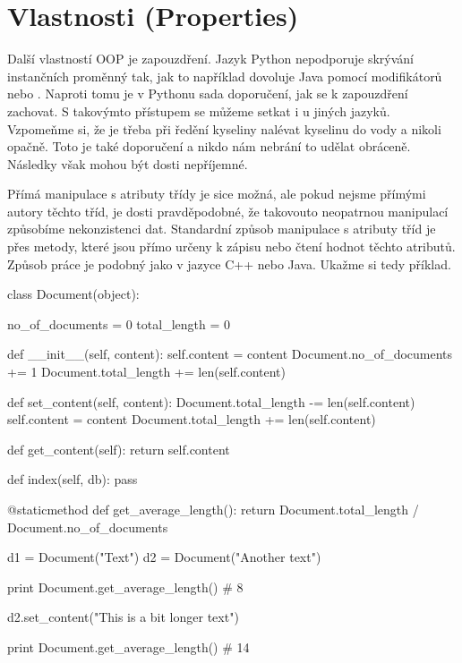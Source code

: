 \section{Vlastnosti (Properties)}

Další vlastností OOP je zapouzdření. Jazyk Python nepodporuje skrývání instančních
proměnný tak, jak to například dovoluje Java pomocí modifikátorů  nebo .
Naproti tomu je v Pythonu sada doporučení, jak se k zapouzdření zachovat. S takovýmto přístupem se můžeme
setkat i u jiných jazyků. Vzpomeňme si, že je třeba při ředění kyseliny nalévat kyselinu do vody
a nikoli opačně. Toto je také doporučení a nikdo nám nebrání to udělat obráceně.
Následky však mohou být dosti nepříjemné.

Přímá manipulace s atributy třídy je sice možná, ale pokud nejsme přímými autory těchto tříd, je dosti
pravděpodobné, že takovouto neopatrnou manipulací způsobíme nekonzistenci dat. Standardní způsob
manipulace s atributy tříd je přes metody, které jsou přímo určeny k zápisu nebo čtení hodnot těchto
atributů. Způsob práce je podobný jako v jazyce C++ nebo Java. Ukažme si tedy příklad.

\begin{python}
class Document(object):
    
    no_of_documents = 0
    total_length = 0

    def __init__(self, content):
        self.content = content
        Document.no_of_documents += 1
        Document.total_length += len(self.content)

    def set_content(self, content):
        Document.total_length -= len(self.content)
        self.content = content
        Document.total_length += len(self.content)

    def get_content(self):
        return self.content

    def index(self, db):
        pass

    @staticmethod
    def get_average_length():
        return Document.total_length / Document.no_of_documents

d1 = Document("Text")
d2 = Document("Another text")

print Document.get_average_length() # 8

d2.set_content("This is a bit longer text")

print Document.get_average_length() # 14
\end{python}

